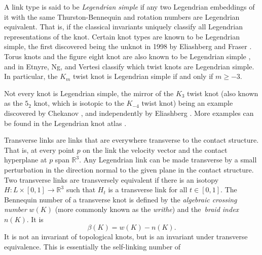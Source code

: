 \documentclass{article}
\theoremstyle{plain}
\begin{document}
        A link type is said to be \textit{Legendrian simple} if
        any two Legendrian embeddings of it with the same Thurston-Bennequin
        and rotation numbers are Legendrian equivalent. That is, if the classical
        invariants uniquely classify all Legendrian representations of the knot.
        Certain knot types are known to be Legendrian simple, the first
        discovered being the unknot in 1998
        by Eliashberg and Fraser
        \cite{EliashbergFraserClassificationTopTrivialLegKnots}.
        Torus knots and the figure eight knot are also known to be Legendrian
        simple
        \cite{EtnyreHondaContactTopologyI}, and in
        \cite{EtnyreEtAlLegendrianAndTransverseTwistKnots} Etnyre, Ng, and
        Vertesi classify which twist knots are Legendrian simple. In particular,
        the $K_{m}$ twist knot is Legendrian simple if and only if
        $m\geq{-3}$.
        \par\hfill\par
        Not every knot is Legendrian simple, the mirror of the $K_{3}$ twist
        knot (also known as the $5_{2}$ knot, which is isotopic to the
        $K_{-4}$ twist knot) being an example discovered by Chekanov
        \cite{ChekanovDifAlgOfLegLinks}, and independently by
        Eliashberg \cite{EliashbergInvariantsInContactTopology}.
        More examples can be found in the
        Legendrian knot atlas \cite{LegendrianKnotAtlas}.
        \par\hfill\par
        Transverse links are links that are everywhere transverse to the
        contact structure. That is, at every point $p$ on the link the velocity
        vector and the contact hyperplane at $p$ span $\mathbb{R}^{3}$.
        Any Legendrian
        link can be made transverse by a small perturbation in the direction
        normal to the given plane in the contact structure.
        Two transverse links are transversely equivalent if there is an
        isotopy $H:L\times[0,1]\rightarrow\mathbb{R}^{3}$ such that $H_{t}$ is a
        transverse link for all $t\in[0,1]$. The Bennequin number of a
        transverse knot is defined by the \textit{algebraic crossing number}
        $w(K)$ (more commonly known as the \textit{writhe}) and the\
        \textit{braid index} $n(K)$. It is
        \begin{equation}
            \beta(K)=w(K)-n(K).
        \end{equation}
        It is not an invariant of topological knots, but is an invariant under
        transverse equivalence. This is essentially the self-linking number of
\end{document}
